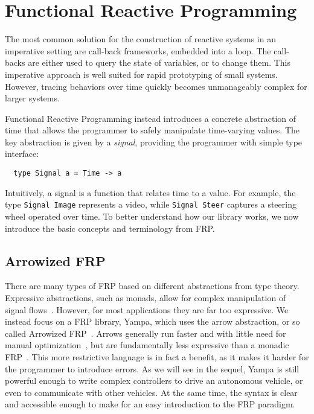 \section{Functional Reactive Programming}

The most common solution for the construction of reactive systems in an imperative setting are call-back frameworks, embedded into a loop.
The call-backs are either used to query the state of variables, or to change them.
This imperative approach is well suited for rapid prototyping of small systems.
However, tracing behaviors over time quickly becomes unmanageably complex for larger systems.

Functional Reactive Programming instead introduces a concrete abstraction of time that allows the programmer to safely manipulate time-varying values. 
The key abstraction is given by a \textit{signal}, providing the programmer with simple type interface:

\begin{lstlisting}
  type Signal a = Time -> a
\end{lstlisting}

\noindent Intuitively, a signal is a function that relates time to a value.
For example, the type \texttt{Signal Image} represents a video, while \texttt{Signal Steer} captures a steering wheel operated over time.
To better understand how our library works, we now introduce the basic concepts and terminology from FRP.

\subsection{Arrowized FRP}

There are many types of FRP based on different abstractions from type theory.
Expressive abstractions, such as monads, allow for complex manipulation of signal flows~\cite{van2014monadic}. 
However, for most applications they are far too expressive.
We instead focus on a FRP library, Yampa, which uses the arrow abstraction, or so called Arrowized FRP~\cite{hudak2003arrows}.
Arrows generally run faster and with little need for manual optimization~\cite{yallop2016causal}, but are fundamentally less expressive than a monadic FRP~\cite{lindley2011idioms}.
This more restrictive language is in fact a benefit, as it makes it harder for the programmer to introduce errors.
As we will see in the sequel, Yampa is still powerful enough to write complex controllers to drive an autonomous vehicle, or even to communicate with other vehicles.
At the same time, the syntax is clear and accessible enough to make for an easy introduction to the FRP paradigm.

